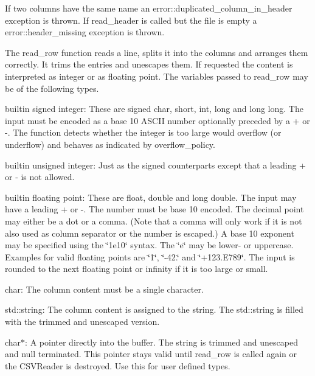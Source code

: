 If two columns have the same name an error\+::duplicated\+\_\+column\+\_\+in\+\_\+header exception is thrown. If {\ttfamily read\+\_\+header} is called but the file is empty a {\ttfamily error\+::header\+\_\+missing} exception is thrown.

The {\ttfamily read\+\_\+row} function reads a line, splits it into the columns and arranges them correctly. It trims the entries and unescapes them. If requested the content is interpreted as integer or as floating point. The variables passed to read\+\_\+row may be of the following types.


\begin{DoxyItemize}
\item builtin signed integer\+: These are {\ttfamily signed char}, {\ttfamily short}, {\ttfamily int}, {\ttfamily long} and {\ttfamily long long}. The input must be encoded as a base 10 A\+S\+C\+II number optionally preceded by a + or -\/. The function detects whether the integer is too large would overflow (or underflow) and behaves as indicated by overflow\+\_\+policy.
\item builtin unsigned integer\+: Just as the signed counterparts except that a leading + or -\/ is not allowed.
\item builtin floating point\+: These are {\ttfamily float}, {\ttfamily double} and {\ttfamily long double}. The input may have a leading + or -\/. The number must be base 10 encoded. The decimal point may either be a dot or a comma. (Note that a comma will only work if it is not also used as column separator or the number is escaped.) A base 10 exponent may be specified using the \char`\"{}1e10\char`\"{} syntax. The \char`\"{}e\char`\"{} may be lower-\/ or uppercase. Examples for valid floating points are \char`\"{}1\char`\"{}, \char`\"{}-\/42.\char`\"{} and \char`\"{}+123.\+E789\char`\"{}. The input is rounded to the next floating point or infinity if it is too large or small.
\item {\ttfamily char}\+: The column content must be a single character.
\item {\ttfamily std\+::string}\+: The column content is assigned to the string. The std\+::string is filled with the trimmed and unescaped version.
\item {\ttfamily char$\ast$}\+: A pointer directly into the buffer. The string is trimmed and unescaped and null terminated. This pointer stays valid until read\+\_\+row is called again or the C\+S\+V\+Reader is destroyed. Use this for user defined types.
\end{DoxyItemize}

